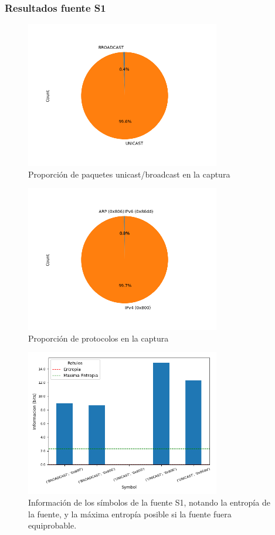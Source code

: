 \subsubsection*{Resultados fuente S1}
\begin{figure}[H]
  \centering
  \includegraphics[width=8.5cm]{figs/broadcast_proportion_starbucks_S1_output.png}
  \caption{\normalfont Proporción de paquetes unicast/broadcast en la captura}
\end{figure}

\begin{figure}[H]
  \centering
  \includegraphics[width=8.5cm]{figs/protocols_proportion_starbucks_S1_output.png}
  \caption{\normalfont Proporción de protocolos en la captura}
\end{figure}

\begin{figure}[H]
  \centering
  \includegraphics[width=8.5cm]{figs/information_starbucks_S1_output.png}
  \caption{\normalfont Información de los símbolos de la fuente S1, notando la entropía de la fuente, y la máxima entropía posible si la fuente fuera equiprobable.}
\end{figure}

